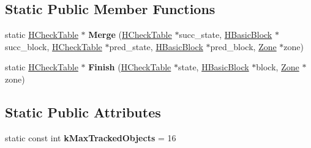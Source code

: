 \subsection*{Static Public Member Functions}
\begin{DoxyCompactItemize}
\item 
static \hyperlink{classv8_1_1internal_1_1_h_check_table}{H\+Check\+Table} $\ast$ {\bfseries Merge} (\hyperlink{classv8_1_1internal_1_1_h_check_table}{H\+Check\+Table} $\ast$succ\+\_\+state, \hyperlink{classv8_1_1internal_1_1_h_basic_block}{H\+Basic\+Block} $\ast$succ\+\_\+block, \hyperlink{classv8_1_1internal_1_1_h_check_table}{H\+Check\+Table} $\ast$pred\+\_\+state, \hyperlink{classv8_1_1internal_1_1_h_basic_block}{H\+Basic\+Block} $\ast$pred\+\_\+block, \hyperlink{classv8_1_1internal_1_1_zone}{Zone} $\ast$zone)\hypertarget{classv8_1_1internal_1_1_h_check_table_ace8ecfd098c7f4032d0c6d5932ff8f2a}{}\label{classv8_1_1internal_1_1_h_check_table_ace8ecfd098c7f4032d0c6d5932ff8f2a}

\item 
static \hyperlink{classv8_1_1internal_1_1_h_check_table}{H\+Check\+Table} $\ast$ {\bfseries Finish} (\hyperlink{classv8_1_1internal_1_1_h_check_table}{H\+Check\+Table} $\ast$state, \hyperlink{classv8_1_1internal_1_1_h_basic_block}{H\+Basic\+Block} $\ast$block, \hyperlink{classv8_1_1internal_1_1_zone}{Zone} $\ast$zone)\hypertarget{classv8_1_1internal_1_1_h_check_table_a13d5ec45a07cd17e8cbf3bd65d1dd1fe}{}\label{classv8_1_1internal_1_1_h_check_table_a13d5ec45a07cd17e8cbf3bd65d1dd1fe}

\end{DoxyCompactItemize}
\subsection*{Static Public Attributes}
\begin{DoxyCompactItemize}
\item 
static const int {\bfseries k\+Max\+Tracked\+Objects} = 16\hypertarget{classv8_1_1internal_1_1_h_check_table_aa0284688daf9067e1f30bb0a4d58bf4f}{}\label{classv8_1_1internal_1_1_h_check_table_aa0284688daf9067e1f30bb0a4d58bf4f}

\end{DoxyCompactItemize}
